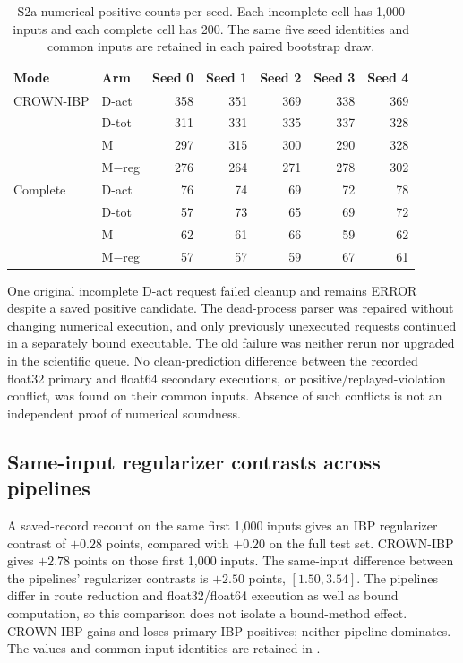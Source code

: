 \begin{table}[ht]
\centering\small
\begin{tabular}{llrrrrr}
\toprule
Mode & Arm & Seed 0 & Seed 1 & Seed 2 & Seed 3 & Seed 4\\
\midrule
CROWN-IBP & D-act &358&351&369&338&369\\
 & D-tot &311&331&335&337&328\\
 & M &297&315&300&290&328\\
 & M$-$reg &276&264&271&278&302\\
\midrule
Complete & D-act &76&74&69&72&78\\
 & D-tot &57&73&65&69&72\\
 & M &62&61&66&59&62\\
 & M$-$reg &57&57&59&67&61\\
\bottomrule
\end{tabular}
\caption{S2a numerical positive counts per seed. Each incomplete cell has
1,000 inputs and each complete cell has 200. The same five seed identities
and common inputs are retained in each paired bootstrap draw.}
\end{table}

One original incomplete D-act request failed cleanup and remains ERROR despite
a saved positive candidate. The dead-process parser was repaired without
changing numerical execution, and only previously unexecuted requests
continued in a separately bound executable. The old failure was neither rerun nor upgraded in the scientific queue. No clean-prediction difference
between the recorded float32 primary and float64 secondary executions, or
positive/replayed-violation conflict, was found on their common inputs. Absence
of such conflicts is not an independent proof of numerical soundness.

\subsection{Same-input regularizer contrasts across pipelines}
\label{app:sameinput}
A saved-record recount on the same first 1,000 inputs gives an IBP
regularizer contrast of $+0.28$ points, compared with $+0.20$ on the full
test set. CROWN-IBP gives $+2.78$ points on those first 1,000 inputs. The
same-input difference between the pipelines' regularizer contrasts is
$+2.50$ points, $[1.50,3.54]$. The pipelines differ in route reduction and
float32/float64 execution as well as bound computation, so this comparison
does not isolate a bound-method effect. CROWN-IBP gains and loses primary
IBP positives; neither pipeline dominates. The values and common-input
identities are retained in .
